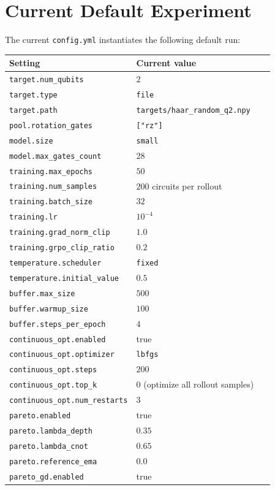\documentclass[11pt]{article}
\begin{document}
\section{Current Default Experiment}

The current \texttt{config.yml} instantiates the following default run:

\begin{center}
\begin{tabular}{>{\raggedright\arraybackslash}p{0.34\linewidth} >{\raggedright\arraybackslash}p{0.52\linewidth}}
\toprule
Setting & Current value \\
\midrule
\texttt{target.num\_qubits} & $2$ \\
\texttt{target.type} & \texttt{file} \\
\texttt{target.path} & \texttt{targets/haar\_random\_q2.npy} \\
\texttt{pool.rotation\_gates} & \texttt{["rz"]} \\
\texttt{model.size} & \texttt{small} \\
\texttt{model.max\_gates\_count} & $28$ \\
\texttt{training.max\_epochs} & $50$ \\
\texttt{training.num\_samples} & $200$ circuits per rollout \\
\texttt{training.batch\_size} & $32$ \\
\texttt{training.lr} & $10^{-4}$ \\
\texttt{training.grad\_norm\_clip} & $1.0$ \\
\texttt{training.grpo\_clip\_ratio} & $0.2$ \\
\texttt{temperature.scheduler} & \texttt{fixed} \\
\texttt{temperature.initial\_value} & $0.5$ \\
\texttt{buffer.max\_size} & $500$ \\
\texttt{buffer.warmup\_size} & $100$ \\
\texttt{buffer.steps\_per\_epoch} & $4$ \\
\texttt{continuous\_opt.enabled} & true \\
\texttt{continuous\_opt.optimizer} & \texttt{lbfgs} \\
\texttt{continuous\_opt.steps} & $200$ \\
\texttt{continuous\_opt.top\_k} & $0$ (optimize all rollout samples) \\
\texttt{continuous\_opt.num\_restarts} & $3$ \\
\texttt{pareto.enabled} & true \\
\texttt{pareto.lambda\_depth} & $0.35$ \\
\texttt{pareto.lambda\_cnot} & $0.65$ \\
\texttt{pareto.reference\_ema} & $0.0$ \\
\texttt{pareto\_gd.enabled} & true \\
\bottomrule
\end{tabular}
\end{center}
\end{document}

